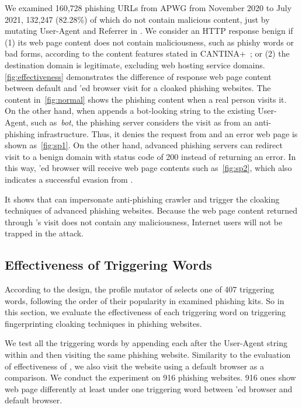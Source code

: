 We examined 160,728 phishing URLs from APWG from November 2020 to July 2021,
132,247 (82.28\%) of which do not contain malicious content, just by mutating User-Agent and Referrer in \spartacus.
We consider an HTTP response benign if (1) its web page content does not contain maliciousness, such as phishy words or bad forms, according to the content features stated in CANTINA+~\cite{xiang2011cantina+};
or (2) the destination domain is legitimate, excluding web hosting service domains.
\autoref{fig:effectiveness} demonstrates the difference of response web page content between default and \spartacus'ed browser visit for a cloaked phishing websites.
The content in~\autoref{fig:normal} shows the phishing content when a real person visits it.
On the other hand, when \spartacus appends a bot-looking string to the existing User-Agent, such as~\emph{bot}, the phishing server considers the visit as from an anti-phishing infrastructure.
Thus, it denies the request from \spartacus and an error web page is shown as~\autoref{fig:sp1}.
On the other hand, advanced phishing servers can redirect visit to a benign domain with status code of 200 instead of returning an error.
In this way, \spartacus'ed browser will receive web page contents such as~\autoref{fig:sp2},
which also indicates a successful evasion 
from \spartacus.

It shows that \spartacus can impersonate anti-phishing crawler and trigger the cloaking techniques of advanced phishing websites.
Because the web page content returned through \spartacus's visit does not contain any maliciousness, Internet users will not be trapped in the attack.



\subsection{Effectiveness of Triggering Words}

According to the design, the profile mutator of \spartacus selects one of 407 triggering words, following the order of their popularity in examined phishing kits.
So in this section, we evaluate the effectiveness of each triggering word on triggering fingerprinting cloaking techniques in phishing websites.

\newcommand{\senstotalphishing}{916\xspace}
\newcommand{\sensevadephishing}{725\xspace}

We test all the triggering words by appending each after the User-Agent string within \spartacus and then visiting the same phishing website.
Similarity to the evaluation of effectiveness of \spartacus, we also visit the website using a default browser as a comparison.
We conduct the experiment on \senstotalphishing phishing websites.
\senstotalphishing ones show web page differently at least under one triggering word between \spartacus'ed browser and default browser.

